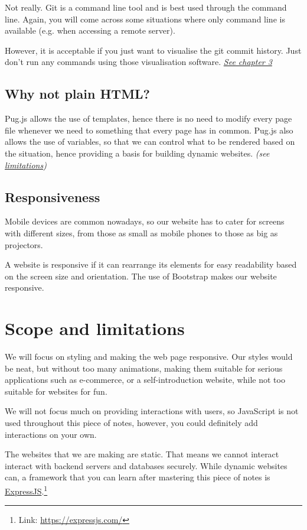 Not really. Git is a command line tool and is best used through the command line. Again, you will come across some situations where only command line is available (e.g. when accessing a remote server). 

However, it is acceptable if you just want to visualise the git commit history. Just don't run any commands using those visualisation software. \textit{\hyperref[sec:sublime]{See chapter 3}}

\subsection*{Why not plain HTML?}

Pug.js allows the use of templates, hence there is no need to modify every page file whenever we need to something that every page has in common. Pug.js also allows the use of variables, so that we can control what to be rendered based on the situation, hence providing a basis for building dynamic websites. \textit{(see \hyperref[sec:limitations]{limitations})}

\subsection*{Responsiveness}

Mobile devices are common nowadays, so our website has to cater for screens with different sizes, from those as small as mobile phones to those as big as projectors. 

A website is responsive if it can rearrange its elements for easy readability based on the screen size and orientation. The use of Bootstrap makes our website responsive.

\section{Scope and limitations}
\label{sec:limitations}
We will focus on styling and making the web page responsive. Our styles would be neat, but without too many animations, making them suitable for serious applications such as e-commerce, or a self-introduction website, while not too suitable for websites for fun.

We will not focus much on providing interactions with users, so JavaScript is not used throughout this piece of notes, however, you could definitely add interactions on your own.

The websites that we are making are static. That means we cannot interact interact with backend servers and databases securely. While dynamic websites can, a framework that you can learn after mastering this piece of notes is \href{https://expressjs.com/}{ExpressJS}.\footnote{Link: \url{https://expressjs.com/}}

